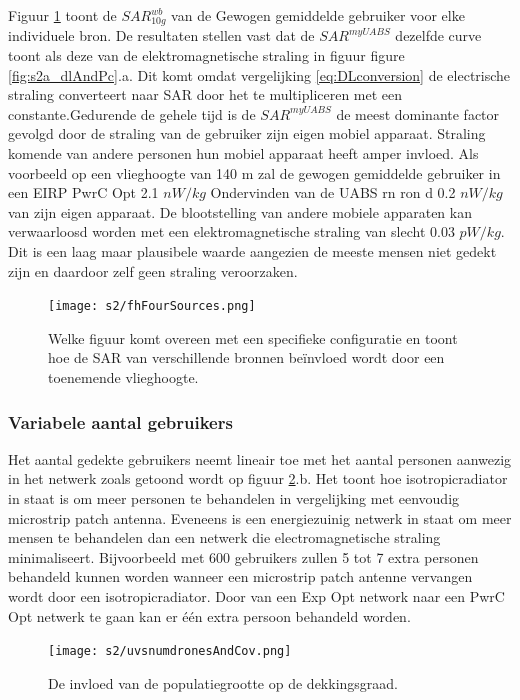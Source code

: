 \documentclass[twocolumn]{phdsymp} %
\begin{document}
Figuur \ref{fig:s2shfourSourcesMatrix} toont de $SAR^{wb}_{10g}$ van de Gewogen gemiddelde gebruiker voor elke individuele bron.
De resultaten stellen vast dat de $SAR^{myUABS}$ dezelfde curve toont als deze van de elektromagnetische straling in figuur
figure \ref{fig:s2a_dlAndPc}.a. Dit komt omdat vergelijking \ref{eq:DLconversion} de electrische straling converteert naar \gls{SAR}
door het te multipliceren met een constante.Gedurende de gehele tijd is de $SAR^{myUABS}$
de meest dominante factor gevolgd door de straling van de gebruiker zijn eigen mobiel apparaat.
Straling komende van andere personen hun mobiel apparaat heeft amper invloed.
Als voorbeeld op een vlieghoogte van 140 m zal de gewogen gemiddelde gebruiker in een
\gls{EIRP} \gls{PwrC Opt} 2.1 $nW/kg$ Ondervinden van de  \gls{UABS} rn ron d
 0.2 $nW/kg$ van zijn eigen apparaat.
De blootstelling van andere mobiele apparaten kan verwaarloosd worden met een elektromagnetische straling van slecht
 0.03 $pW/kg$. Dit is een laag maar plausibele waarde aangezien de meeste mensen niet gedekt zijn 
en daardoor zelf geen straling veroorzaken.


\begin{figure}[h!]
  \texttt{[image: s2/fhFourSources.png]}
  \caption{ Welke figuur komt overeen met een specifieke configuratie en toont hoe de 
     \acs{SAR} van verschillende bronnen be\"invloed wordt door een toenemende vlieghoogte.}
  \label{fig:s2shfourSourcesMatrix}
\end{figure}

\subsubsection{Variabele aantal gebruikers}
Het aantal gedekte gebruikers neemt lineair toe met het aantal personen aanwezig in het netwerk zoals getoond wordt op figuur
\ref{fig:s2uvsnumcovusers}.b. Het toont hoe  \gls{isotropicradiator} in staat is om meer personen te behandelen in vergelijking met eenvoudig
 microstrip patch antenna. Eveneens is een energiezuinig netwerk in staat om meer mensen te behandelen dan een netwerk die electromagnetische straling minimaliseert.
 Bijvoorbeeld met 600 gebruikers zullen 5 tot 7 extra personen behandeld kunnen worden wanneer 
 een microstrip patch antenne vervangen wordt door een  \gls{isotropicradiator}.
Door van een \gls{Exp Opt} network naar een \gls{PwrC Opt} netwerk te gaan kan er \'e\'en extra persoon 
behandeld worden.

\begin{figure}[h!]
  \texttt{[image: s2/uvsnumdronesAndCov.png]}
  \caption{De invloed van de populatiegrootte op de dekkingsgraad.}
  \label{fig:s2uvsnumcovusers}
\end{figure}
\end{document}
